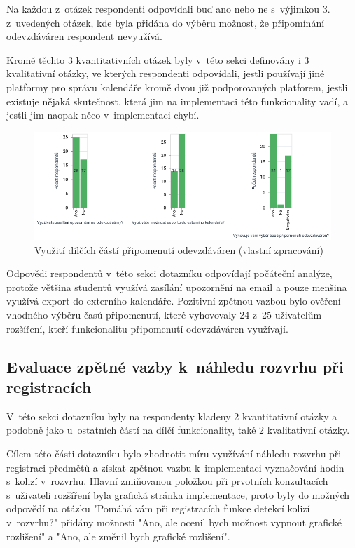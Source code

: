 Na každou z~otázek respondenti odpovídali buď ano nebo ne s~výjimkou 3. z~uvedených otázek, kde byla přidána do výběru možnost, že připomínání odevzdáváren respondent nevyužívá.

Kromě těchto 3 kvantitativních otázek byly v~této sekci definovány i 3 kvalitativní otázky, ve kterých respondenti odpovídali, jestli používají jiné platformy pro správu kalendáře kromě dvou již podporovaných platforem, jestli existuje nějaká skutečnost, která jim na implementaci této funkcionality vadí, a jestli jim naopak něco v~implementaci chybí.

\begin{figure}[htbp!]\centering
    \includegraphics[width=\textwidth]{img/pripomenuti-vizualizace.png}
    \caption{Využití dílčích částí připomenutí odevzdáváren (vlastní zpracování)}
    \label{fig:pripomenuti-vizualizace}
\end{figure}

Odpovědi respondentů v~této sekci dotazníku odpovídají počáteční analýze, protože většina studentů využívá zasílání upozornění na email a pouze menšina využívá export do externího kalendáře. Pozitivní zpětnou vazbou bylo ověření vhodného výběru časů připomenutí, které vyhovovaly 24 z~25 uživatelům rozšíření, kteří funkcionalitu připomenutí odevzdáváren využívají.

\subsection{Evaluace zpětné vazby k~náhledu rozvrhu při registracích}

V~této sekci dotazníku byly na respondenty kladeny 2 kvantitativní otázky a podobně jako u~ostatních částí na dílčí funkcionality, také 2 kvalitativní otázky.

Cílem této části dotazníku bylo zhodnotit míru využívání náhledu rozvrhu při registraci předmětů a získat zpětnou vazbu k~implementaci vyznačování hodin s~kolizí v~rozvrhu. Hlavní zmiňovanou položkou při prvotních konzultacích s~uživateli rozšíření byla grafická stránka implementace, proto byly do možných odpovědí na otázku "Pomáhá vám při registracích funkce detekcí kolizí v~rozvrhu?" přidány možnosti "Ano, ale ocenil bych možnost vypnout grafické rozlišení" a "Ano, ale změnil bych grafické rozlišení".  

